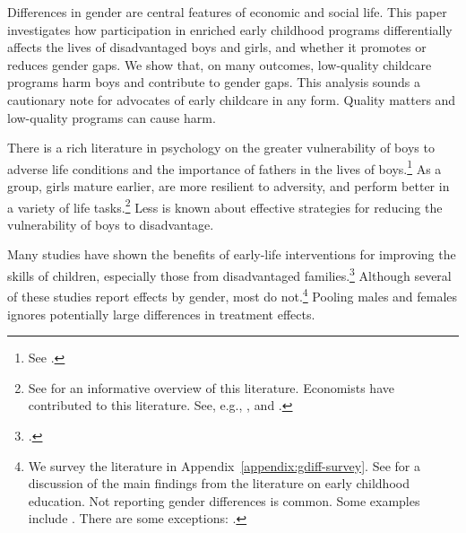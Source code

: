 Differences in gender are central features of economic and social life. This paper investigates how participation in enriched early childhood programs differentially affects the lives of disadvantaged boys and girls, and whether it promotes or reduces gender gaps. We show that, on many outcomes, low-quality childcare programs harm boys and contribute to gender gaps. This analysis sounds a cautionary note for advocates of early childcare in any form. Quality matters and low-quality programs can cause harm.

There is a rich literature in psychology on the greater vulnerability of boys to adverse life conditions and the importance of fathers in the lives of boys.\footnote{See \citet{golding2016psychology}.} As a group, girls mature earlier, are more resilient to adversity, and perform better in a variety of life tasks.\footnote{See \citet{Schore_2017_IMHJ} for an informative overview of this literature. Economists have contributed to this literature. See, e.g., \citet{Bertrand_Pan_2013_AEJAE}, \citet{Autor-etal_2015_Family-Disadvantage} and \citet{Kottelenberg-Lehrer_2014_Gender-Effects}.} Less is known about effective strategies for reducing the vulnerability of boys to disadvantage.

Many studies have shown the benefits of early-life interventions for improving the skills of children, especially those from disadvantaged families.\footnote{\citet{Currie_2011_AER,Elango_Hojman_etal_2016_Early-Edu}.} Although several of these studies report effects by gender, most do not.\footnote{We survey the literature in Appendix~\ref{appendix:gdiff-survey}. See \citet{Elango_Hojman_etal_2016_Early-Edu} for a discussion of the main findings from the literature on early childhood education. Not reporting gender differences is common. Some examples include \citet{Bernal_Keane_2011_JoLE,Cascio_Schanzenbach_2013_ImpactsExpandingAccess,Bitler_et_al_2014_Head_Start_Unpublished,Kline_Walters_2016_QJE}. There are some exceptions: \citet{Heckman_Moon_etal_2010_QE,Campbell_Conti_etal_2014_EarlyChildhoodInvestments,Garcia_Heckman_Leaf_etal_2017_Comp_CBA_Unpublished}.} Pooling males and females ignores potentially large differences in treatment effects.

